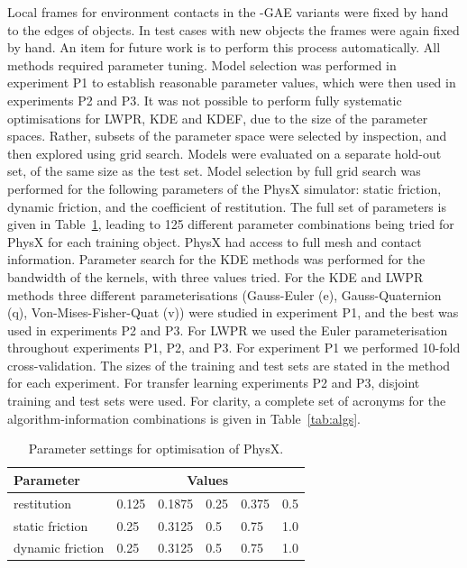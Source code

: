 Local frames for environment contacts in the -GAE variants were fixed
by hand to the edges of objects. In test cases with new objects the
frames were again fixed by hand.  An item for future work is to
perform this process automatically.  All methods required parameter tuning. Model selection was performed in experiment P1 to establish reasonable parameter values, which were then used in experiments P2 and P3.  It was not possible to perform fully systematic optimisations for LWPR, KDE and KDEF, due to the size of the parameter spaces.  Rather, subsets of the parameter space were selected by inspection, and then explored using grid search.  Models were evaluated on a separate hold-out set, of the same size as the test set. Model selection by full grid search was performed for the following parameters of the PhysX simulator: static friction, dynamic friction, and the coefficient of restitution. The full set of parameters is given in Table~\ref{tab:physx}, leading to 125 different parameter combinations being tried for PhysX for each training object. PhysX had access to full mesh and contact information. Parameter search for the KDE methods was performed for the bandwidth of the kernels, with three values tried. For the KDE and LWPR methods three different parameterisations (Gauss-Euler (e), Gauss-Quaternion (q), Von-Mises-Fisher-Quat (v)) were studied in experiment P1, and the best was used in experiments P2 and P3. For LWPR we used the Euler parameterisation throughout experiments P1, P2, and P3. For experiment P1 we performed 10-fold cross-validation. The sizes of the training and test sets are stated in the method for each experiment. For transfer learning experiments P2 and P3, disjoint training and test sets were used. For clarity, a complete set of acronyms for the algorithm-information combinations is given in Table~\ref{tab:algs}. 
\begin{table}[b]
\begin{center}
\begin{tabular}{|l|l|l|l|l|l|}\hline
Parameter & \multicolumn{5}{|c|}{Values} \\ \hline
restitution & 0.125 & 0.1875 & 0.25 &  0.375 & 0.5\\ \hline
static friction & 0.25 & 0.3125 & 0.5 & 0.75 & 1.0  \\ \hline
dynamic friction & 0.25 & 0.3125 & 0.5 & 0.75 & 1.0\\ \hline
\end{tabular}
\caption{Parameter settings for optimisation of PhysX. \label{tab:physx}}
\end{center}
\end{table}

